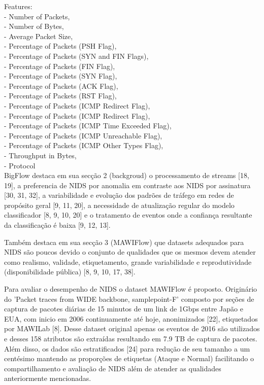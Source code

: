 Features:\\
    - Number of Packets,\\
    - Number of Bytes,\\
    - Average Packet Size,\\
    - Percentage of Packets (PSH Flag),\\
    - Percentage of Packets (SYN and FIN Flags),\\
    - Percentage of Packets (FIN Flag),\\
    - Percentage of Packets (SYN Flag),\\
    - Percentage of Packets (ACK Flag),\\
    - Percentage of Packets (RST Flag),\\
    - Percentage of Packets (ICMP Redirect Flag),\\
    - Percentage of Packets (ICMP Redirect Flag),\\
    - Percentage of Packets (ICMP Time Exceeded Flag),\\
    - Percentage of Packets (ICMP Unreachable Flag),\\
    - Percentage of Packets (ICMP Other Types Flag),\\
    - Throughput in Bytes,\\
    - Protocol\\


BigFlow destaca em sua secção 2 (backgroud) o processamento de streams [18, 19],
a preferencia de NIDS por anomalia em contraste aos NIDS por assinatura [30, 31, 32],
a variabilidade e evolução dos padrões de tráfego em redes de propósito geral [9, 11, 20],
a necessidade de atualização regular do modelo classificador [8, 9, 10, 20] e
o tratamento de eventos onde a confiança resultante da classificação é baixa [9, 12, 13].

Também destaca em sua secção 3 (MAWIFlow) 
que datasets adequados para NIDS são poucos devido o conjunto de qualidades que os mesmos
devem atender como realismo, validade, etiquetamento, grande variabilidade
e reprodutividade (disponibilidade pública) [8, 9, 10, 17, 38].

Para avaliar o desempenho de NIDS o dataset MAWIFlow é proposto. Originário do 
'Packet traces from WIDE backbone, samplepoint-F' composto por seções de captura de pacotes
diárias de 15 minutos de um link de 1Gbps entre Japão e EUA, com inicio em 2006 continuamente até hoje,
anonimizados [22], etiquetados por MAWILab [8].
Desse dataset original apenas os eventos de 2016 são utilizados e desses 158 atributos são extraídas
resultando em 7.9 TB de captura de pacotes. Além disso, os dados são estratificados [24] para redução
de seu tamanho a um centésimo mantendo as proporções de etiquetas (Ataque e Normal)
facilitando o compartilhamento e avaliação de NIDS além de atender as qualidades anteriormente mencionadas.

